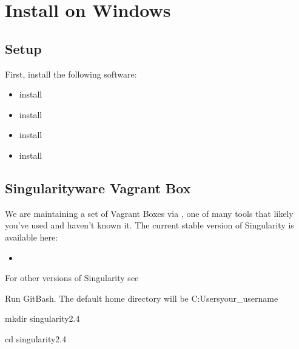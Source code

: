 \documentclass[letterpaper,10pt,english]{sphinxmanual}
\begin{document}
\section{Install on Windows}
\label{\detokenize{installation:install-on-windows}}

\subsection{Setup}
\label{\detokenize{installation:setup}}
First, install the following software:
\begin{itemize}
\item {} 
install 

\item {} 
install 

\item {} 
install 

\item {} 
install 

\end{itemize}


\subsection{Singularityware Vagrant Box}
\label{\detokenize{installation:singularityware-vagrant-box}}
We are maintaining a set of Vagrant Boxes via , one of  many tools that likely you’ve used and haven’t known it. The current stable version of Singularity is available here:
\begin{itemize}
\item {} 

\end{itemize}

For other versions of Singularity see 

Run GitBash. The default home directory will be C:Usersyour\_username

%
\begin{sphinxVerbatim}[commandchars=\\\{\}]
mkdir singularity\PYGZhy{}2.4

cd singularity\PYGZhy{}2.4
\end{sphinxVerbatim}
\end{document}
